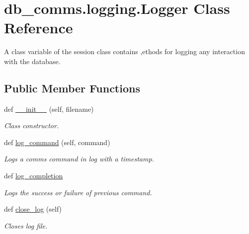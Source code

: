 \hypertarget{classdb__comms_1_1logging_1_1_logger}{}\section{db\+\_\+comms.\+logging.\+Logger Class Reference}
\label{classdb__comms_1_1logging_1_1_logger}


A class variable of the session class contains ,ethods for logging any interaction with the database.  


\subsection*{Public Member Functions}
\begin{DoxyCompactItemize}
\item 
def \hyperlink{classdb__comms_1_1logging_1_1_logger_a1672e537ac888fe88bbe302d134670ab}{\+\_\+\+\_\+init\+\_\+\+\_\+} (self, filename)
\begin{DoxyCompactList}\small\item\em Class constructor. \end{DoxyCompactList}\item 
def \hyperlink{classdb__comms_1_1logging_1_1_logger_abe4a3d20372a6d263ef604de28981c27}{log\+\_\+command} (self, command)
\begin{DoxyCompactList}\small\item\em Logs a comms command in log with a timestamp. \end{DoxyCompactList}\item 
def \hyperlink{classdb__comms_1_1logging_1_1_logger_a04d26741914d63a6cd2e2692d54a3650}{log\+\_\+completion}
\begin{DoxyCompactList}\small\item\em Logs the success or failure of previous command. \end{DoxyCompactList}\item 
def \hyperlink{classdb__comms_1_1logging_1_1_logger_ad3a84b9fdf7cc3d5492b0e9b89ef8118}{close\+\_\+log} (self)
\begin{DoxyCompactList}\small\item\em Closes log file. \end{DoxyCompactList}\end{DoxyCompactItemize}
